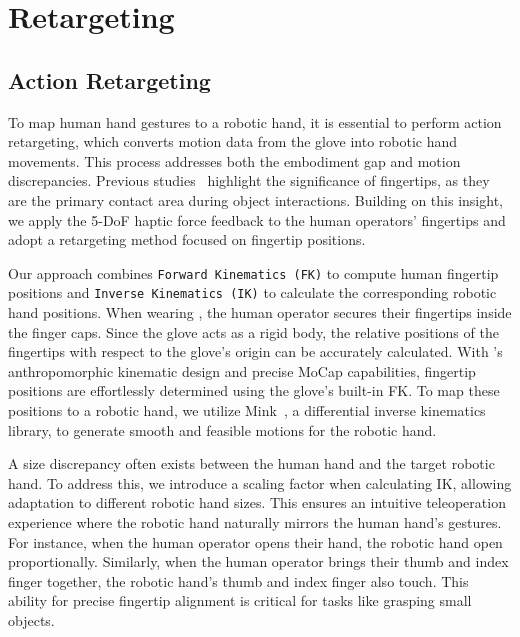 \section{Retargeting}



\subsection{Action Retargeting}

To map human hand gestures to a robotic hand, it is essential to perform action retargeting, which converts motion data from the glove into robotic hand movements. This process addresses both the embodiment gap and motion discrepancies. 
%
Previous studies~\cite{wang2024dexcap, fan2023arctic, taheri2020grab} highlight the significance of fingertips, as they are the primary contact area during object interactions. Building on this insight, we apply the 5-DoF haptic force feedback to the human operators' fingertips and adopt a retargeting method focused on fingertip positions.

Our approach combines \texttt{Forward Kinematics~(FK)} to compute human fingertip positions and \texttt{Inverse Kinematics~(IK)} to calculate the corresponding robotic hand positions. 
%
When wearing \oursystem, the human operator secures their fingertips inside the finger caps. Since the glove acts as a rigid body, the relative positions of the fingertips with respect to the glove’s origin can be accurately calculated. With \oursystem's anthropomorphic kinematic design and precise MoCap capabilities, fingertip positions are effortlessly determined using the glove’s built-in FK.
%
To map these positions to a robotic hand, we utilize Mink~\cite{Zakka_Mink_Python_inverse_2024}, a differential inverse kinematics library, to generate smooth and feasible motions for the robotic hand. 

A size discrepancy often exists between the human hand and the target robotic hand. To address this, we introduce a scaling factor when calculating IK, allowing adaptation to different robotic hand sizes. This ensures an intuitive teleoperation experience where the robotic hand naturally mirrors the human hand's gestures. For instance, when the human operator opens their hand, the robotic hand open proportionally. Similarly, when the human operator brings their thumb and index finger together, the robotic hand's thumb and index finger also touch. This ability for precise fingertip alignment is critical for tasks like grasping small objects.

